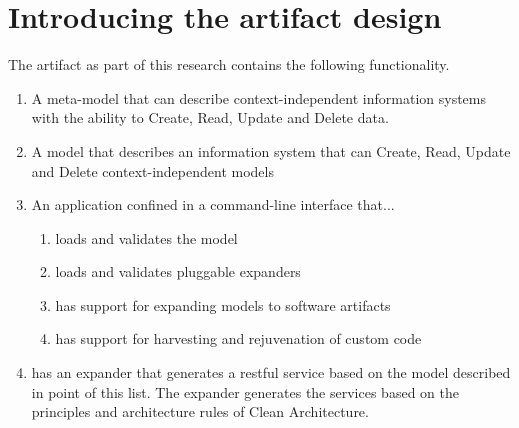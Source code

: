 \section{Introducing the artifact design} \label{sec:artifact_intro}

\renewcommand{\labelenumii}{\arabic{enumi}.\arabic{enumii}}
\renewcommand{\labelenumiii}{\arabic{enumi}.\arabic{enumii}.\arabic{enumiii}}
\renewcommand{\labelenumiv}{\arabic{enumi}.\arabic{enumii}.\arabic{enumiii}.\arabic{enumiv}}

The artifact as part of this research contains the following functionality.

\begin{enumerate}
    \item A meta-model that can describe context-independent information systems
    with the ability to Create, Read, Update and Delete data.
    \item A model that describes an information system that can Create, Read, Update and
    Delete context-independent models
    \item An application confined in a command-line interface that...
    \begin{enumerate}
        \item loads and validates the model 
        \item loads and validates pluggable expanders
        \item has support for expanding models to software artifacts
        \item has support for harvesting and rejuvenation of custom code
    \end{enumerate}
    \item has an expander that generates a restful service based on the model described
    in point of this list. The expander generates the services based on the principles
    and architecture rules of Clean Architecture.
    
\end{enumerate}